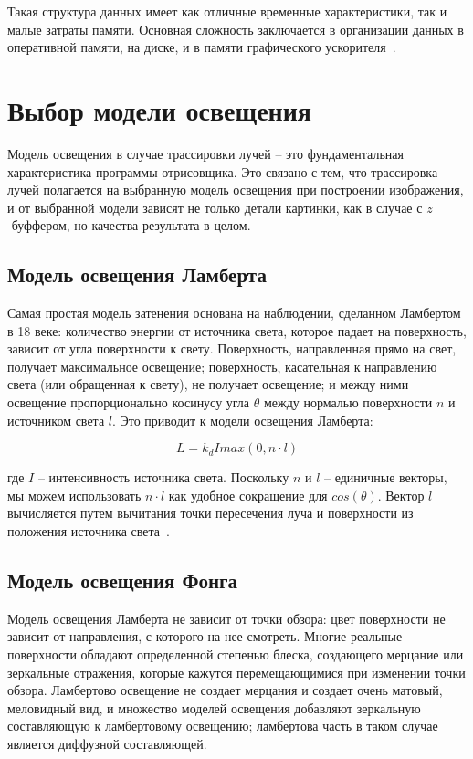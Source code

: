 Такая структура данных имеет как отличные временные характеристики, так и малые затраты памяти.
Основная сложность заключается в организации данных в оперативной памяти, на диске, 
и в памяти графического ускорителя~\cite{ESVOAEaI}.

\section{Выбор модели освещения}

Модель освещения в случае трассировки лучей -- это фундаментальная характеристика программы-отрисовщика. Это связано с тем, что трассировка лучей полагается на выбранную модель освещения
при построении изображения, и от выбранной модели зависят не только детали картинки, как в случае с $z$-буффером, но качества результата в целом.

\subsection{Модель освещения Ламберта}
Самая простая модель затенения основана на наблюдении, сделанном Ламбертом в 18 веке: 
количество энергии от источника света, которое падает на поверхность, зависит от угла 
поверхности к свету. Поверхность, направленная прямо на свет, получает максимальное 
освещение; поверхность, касательная к направлению света (или обращенная к свету), 
не получает освещение; и между ними освещение пропорционально косинусу угла $\theta$
между нормалью поверхности $n$ и источником света $l$. Это приводит к 
модели освещения Ламберта:

\begin{equation}
L = k_d I max(0, n \cdot l)
\end{equation}

где $I$ -- интенсивность источника света. Поскольку $n$ и $l$ -- единичные векторы, мы можем использовать $n \cdot l$ как удобное сокращение для $cos(\theta)$. 
Вектор $l$ вычисляется путем вычитания точки пересечения луча и поверхности из положения 
источника света~\cite{FoCG}.

\subsection{Модель освещения Фонга}
Модель освещения Ламберта не зависит от точки обзора: цвет поверхности не 
зависит от направления, с которого на нее смотреть. Многие реальные поверхности 
обладают определенной степенью блеска, создающего мерцание или зеркальные отражения, 
которые кажутся перемещающимися при изменении точки обзора. 
Ламбертово освещение не создает мерцания и создает очень матовый, 
меловидный вид, и множество моделей освещения добавляют зеркальную 
составляющую к ламбертовому освещению; ламбертова часть в таком случае 
является диффузной составляющей. 

